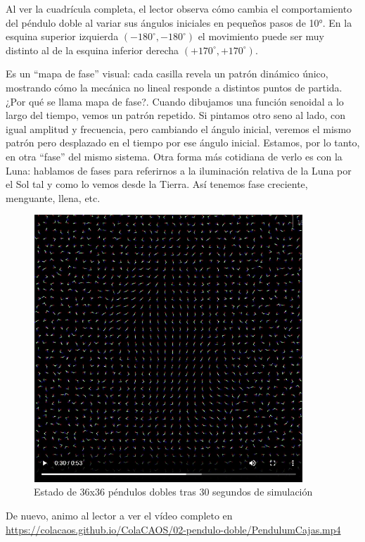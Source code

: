 \documentclass[
  10pt,
  a4paper,
  DIV=11,
  numbers=noendperiod,
  open=any]{scrreprt}
\numberwithin{equation}{chapter}
\numberwithin{equation}{section}
\renewcommand{\[}{\begin{equation}}
\renewcommand{\]}{\end{equation}}
\begin{document}
Al ver la cuadrícula completa, el lector observa cómo cambia el
comportamiento del péndulo doble al variar sus ángulos iniciales en
pequeños pasos de 10°. En la esquina superior izquierda
\((-180^\circ,-180^\circ)\) el movimiento puede ser muy distinto al de
la esquina inferior derecha \((+170^\circ,+170^\circ)\).

Es un ``mapa de fase'' visual: cada casilla revela un patrón dinámico
único, mostrando cómo la mecánica no lineal responde a distintos puntos
de partida. ¿Por qué se llama mapa de fase?. Cuando dibujamos una
función senoidal a lo largo del tiempo, vemos un patrón repetido. Si
pintamos otro seno al lado, con igual amplitud y frecuencia, pero
cambiando el ángulo inicial, veremos el mismo patrón pero desplazado en
el tiempo por ese ángulo inicial. Estamos, por lo tanto, en otra
``fase'' del mismo sistema. Otra forma más cotidiana de verlo es con la
Luna: hablamos de fases para referirnos a la iluminación relativa de la
Luna por el Sol tal y como lo vemos desde la Tierra. Así tenemos fase
creciente, menguante, llena, etc.


\begin{figure}[h]
  \centering
  \includegraphics[width=0.9\textwidth]{02-pendulo-doble/mapafases1.png}
  \caption{Estado de 36x36 péndulos dobles tras 30 segundos de simulación}
\end{figure}


De nuevo, animo al lector a ver el vídeo completo en \url{https://colacaos.github.io/ColaCAOS/02-pendulo-doble/PendulumCajas.mp4}
\end{document}

